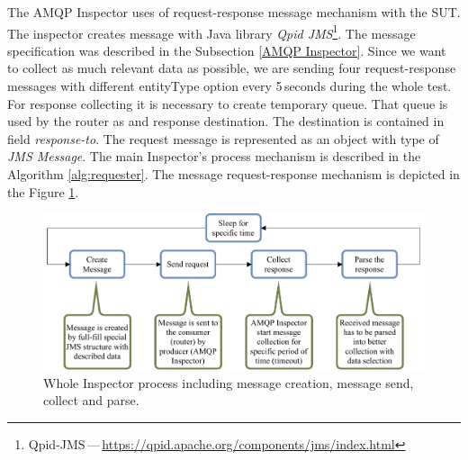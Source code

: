 The AMQP Inspector uses of request-response message mechanism with the SUT. The inspector creates message with Java library \emph{Qpid JMS}\footnote{Qpid-JMS\,---\,\url{https://qpid.apache.org/components/jms/index.html}}. The message specification was described in the Subsection \ref{AMQP Inspector}. Since we want to collect as much relevant data as possible, we are sending four request-response messages with different entityType option every 5\,seconds during the whole test. For response collecting it is necessary to create temporary queue. That queue is used by the router as and response destination. The destination is contained in field \emph{response-to}. The request message is represented as an object with type of \emph{JMS Message}. The main Inspector's process mechanism is described in the Algorithm \ref{alg:requester}. The message request-response mechanism is depicted in the Figure \ref{fig:collector}.

\begin{figure}[H]
  \centering
  \includegraphics[width=15cm]{obrazky-figures/inspector_collector.pdf}
  \caption{Whole Inspector process including message creation, message send, collect and parse.}
  \label{fig:collector}
\end{figure}


